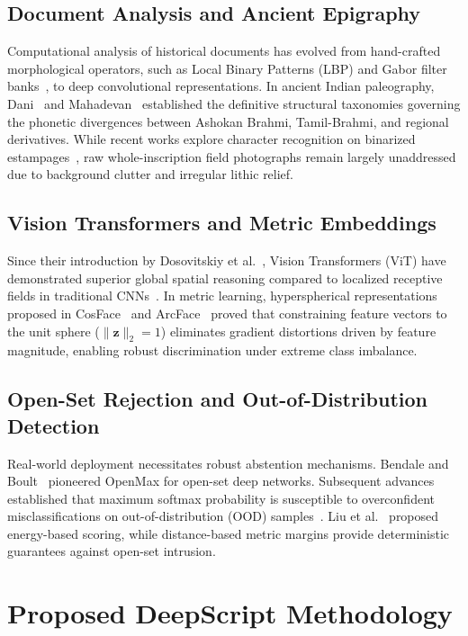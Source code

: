 \documentclass[conference,10pt]{IEEEtran}
\begin{document}
\subsection{Document Analysis and Ancient Epigraphy}
Computational analysis of historical documents has evolved from hand-crafted morphological operators, such as Local Binary Patterns (LBP) and Gabor filter banks~\cite{diem2014recognizing,shafait2018document}, to deep convolutional representations. In ancient Indian paleography, Dani~\cite{dani1963indian} and Mahadevan~\cite{mahadevan2003early} established the definitive structural taxonomies governing the phonetic divergences between Ashokan Brahmi, Tamil-Brahmi, and regional derivatives. While recent works explore character recognition on binarized estampages~\cite{sukumar2024tbsi}, raw whole-inscription field photographs remain largely unaddressed due to background clutter and irregular lithic relief.

\subsection{Vision Transformers and Metric Embeddings}
Since their introduction by Dosovitskiy et al.~\cite{dosovitskiy2021vit}, Vision Transformers (ViT) have demonstrated superior global spatial reasoning compared to localized receptive fields in traditional CNNs~\cite{he2016deep,liu2022convnet}. In metric learning, hyperspherical representations proposed in CosFace~\cite{wang2018cosface} and ArcFace~\cite{deng2019arcface} proved that constraining feature vectors to the unit sphere ($\|\mathbf{z}\|_2 = 1$) eliminates gradient distortions driven by feature magnitude, enabling robust discrimination under extreme class imbalance.

\subsection{Open-Set Rejection and Out-of-Distribution Detection}
Real-world deployment necessitates robust abstention mechanisms. Bendale and Boult~\cite{bendale2016towards} pioneered OpenMax for open-set deep networks. Subsequent advances established that maximum softmax probability is susceptible to overconfident misclassifications on out-of-distribution (OOD) samples~\cite{hendrycks2017baseline}. Liu et al.~\cite{liu2020energy} proposed energy-based scoring, while distance-based metric margins provide deterministic guarantees against open-set intrusion.

\section{Proposed DeepScript Methodology}
\end{document}
